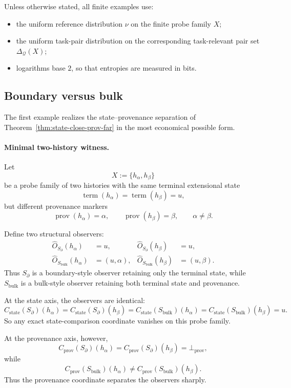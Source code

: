 \documentclass[11pt,twoside]{article}
\theoremstyle{definition}
\newcommand{\bulk}{\mathrm{bulk}}
\begin{document}
Unless otherwise stated, all finite examples use:
\begin{itemize}[leftmargin=*]
  \item the uniform reference distribution \(\nu\) on the finite probe family \(X\);
  \item the uniform task-pair distribution on the corresponding task-relevant pair set \(\Delta_{\mathcal{Q}}(X)\);
  \item logarithms base \(2\), so that entropies are measured in bits.
\end{itemize}

\subsection{Boundary versus bulk}
\label{subsec:boundary-vs-bulk}

The first example realizes the state--provenance separation of Theorem~\ref{thm:state-close-prov-far} in the most economical possible form.

\paragraph{Minimal two-history witness.}
Let
\[
  X := \{ h_\alpha, h_\beta \}
\]
be a probe family of two histories with the same terminal extensional state
\[
  \operatorname{term}(h_\alpha)=\operatorname{term}(h_\beta)=u,
\]
but different provenance markers
\[
  \operatorname{prov}(h_\alpha)=\alpha,
  \qquad
  \operatorname{prov}(h_\beta)=\beta,
  \qquad
  \alpha\neq\beta.
\]

Define two structural observers:
\begin{align*}
  \widehat{O}_{S_{\partial}}(h_\alpha) &= u, &
  \widehat{O}_{S_{\partial}}(h_\beta) &= u, \\
  \widehat{O}_{S_{\bulk}}(h_\alpha) &= (u,\alpha), &
  \widehat{O}_{S_{\bulk}}(h_\beta) &= (u,\beta).
\end{align*}
Thus \(S_{\partial}\) is a boundary-style observer retaining only the terminal state, while \(S_{\bulk}\) is a bulk-style observer retaining both terminal state and provenance.

At the state axis, the observers are identical:
\[
  C_{\mathrm{state}}(S_{\partial})(h_\alpha)
  =
  C_{\mathrm{state}}(S_{\partial})(h_\beta)
  =
  C_{\mathrm{state}}(S_{\bulk})(h_\alpha)
  =
  C_{\mathrm{state}}(S_{\bulk})(h_\beta)
  =
  u.
\]
So any exact state-comparison coordinate vanishes on this probe family.

At the provenance axis, however,
\[
  C_{\mathrm{prov}}(S_{\partial})(h_\alpha)
  =
  C_{\mathrm{prov}}(S_{\partial})(h_\beta)
  =
  \bot_{\mathrm{prov}},
\]
while
\[
  C_{\mathrm{prov}}(S_{\bulk})(h_\alpha)
  \neq
  C_{\mathrm{prov}}(S_{\bulk})(h_\beta).
\]
Thus the provenance coordinate separates the observers sharply.
\end{document}
